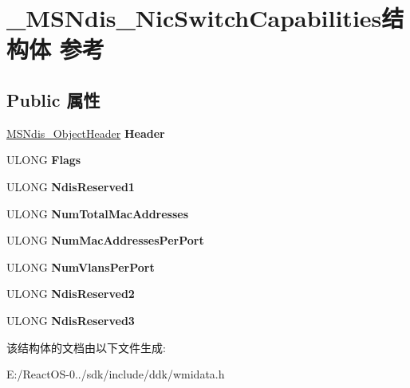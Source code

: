 \hypertarget{struct___m_s_ndis___nic_switch_capabilities}{}\section{\+\_\+\+M\+S\+Ndis\+\_\+\+Nic\+Switch\+Capabilities结构体 参考}
\label{struct___m_s_ndis___nic_switch_capabilities}
\subsection*{Public 属性}
\begin{DoxyCompactItemize}
\item 
\mbox{\label{struct___m_s_ndis___nic_switch_capabilities_ae48bb2a175258e32a8cd6b96fb621244}} 
\hyperlink{struct___m_s_ndis___object_header}{M\+S\+Ndis\+\_\+\+Object\+Header} {\bfseries Header}
\item 
\mbox{\label{struct___m_s_ndis___nic_switch_capabilities_a3b7587d1a5f9749fd3c5c2039c8a6c4a}} 
U\+L\+O\+NG {\bfseries Flags}
\item 
\mbox{\label{struct___m_s_ndis___nic_switch_capabilities_a7377e585ca826d443667a10488a71a3b}} 
U\+L\+O\+NG {\bfseries Ndis\+Reserved1}
\item 
\mbox{\label{struct___m_s_ndis___nic_switch_capabilities_a727512aa7210962b656a45a334e16c81}} 
U\+L\+O\+NG {\bfseries Num\+Total\+Mac\+Addresses}
\item 
\mbox{\label{struct___m_s_ndis___nic_switch_capabilities_ac9b4249249d39047753a97e1cf193fb1}} 
U\+L\+O\+NG {\bfseries Num\+Mac\+Addresses\+Per\+Port}
\item 
\mbox{\label{struct___m_s_ndis___nic_switch_capabilities_ab19c82da3f3724ab8a16148bcb4fe83c}} 
U\+L\+O\+NG {\bfseries Num\+Vlans\+Per\+Port}
\item 
\mbox{\label{struct___m_s_ndis___nic_switch_capabilities_aeef27e9c479a80767556e069d9bedcd7}} 
U\+L\+O\+NG {\bfseries Ndis\+Reserved2}
\item 
\mbox{\label{struct___m_s_ndis___nic_switch_capabilities_a9506fef2d1fa0f1e94df5421ba3c9f66}} 
U\+L\+O\+NG {\bfseries Ndis\+Reserved3}
\end{DoxyCompactItemize}


该结构体的文档由以下文件生成\+:\begin{DoxyCompactItemize}
\item 
E\+:/\+React\+O\+S-\/0../sdk/include/ddk/wmidata.\+h\end{DoxyCompactItemize}
